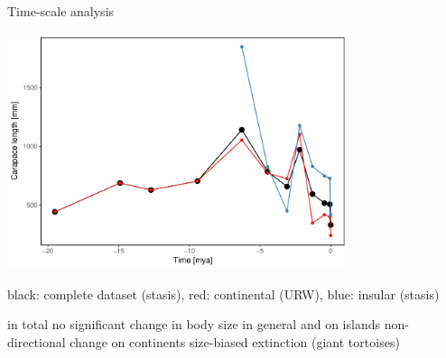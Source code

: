 \begin{frame}{Time-scale analysis}
\begin{center}
	\includegraphics[width=0.75\textwidth]{MA_JJ_files/figure-latex/paleoTScombined3.pdf}%
\end{center}
black: complete dataset (stasis), red: continental (URW), blue: insular (stasis)

	
\end{frame}

\begin{frame}
\begin{itemize}[<+->]
	\p in total no significant change in body size in general and on islands
	\p non-directional change on continents \pf size-biased extinction (giant tortoises)
\end{itemize}
\end{frame}

